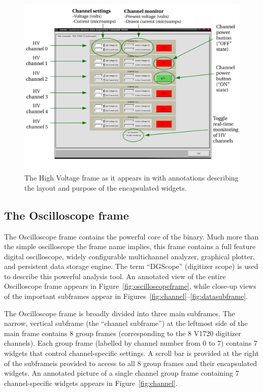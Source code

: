 \begin{figure}
  \centering
  \includegraphics[width=6in]{figures/HighVoltageFrame}
  \caption{The High Voltage frame as it appears in
    \ADAQ with annotations describing the layout and
    purpose of the encapsulated widgets.}
  \label{fig:highvoltageframe}
\end{figure}

\subsection{The Oscilloscope frame}
The Oscilloscope frame contains the powerful core of the
\ADAQ binary. Much more than the simple oscilloscope
the frame name implies, this frame contains a full feature digital
oscilloscope, widely configurable multichannel analyzer, graphical
plotter, and persistent data storage engine. The term ``DGScope''
(digitizer scope) is used to describe this powerful analysis tool. An
annotated view of the entire Oscilloscope frame appears in
Figure~\ref{fig:oscilloscopeframe}, while close-up views of the
important subframes appear in
Figures~\ref{fig:channel}--\ref{fig:datasubframe}.

The Oscilloscope frame is broadly divided into three main
subframes. The narrow, vertical subframe (the ``channel subframe'') at
the leftmost side of the main frame contains 8 group frames
(corresponding to the 8 V1720 digitizer channels).  Each group frame
(labelled by channel number from 0 to 7) contains 7 widgets that
control channel-specific settings. A scroll bar is provided at the
right of the subframeis provided to access to all 8 group frames and
their encapsulated widgets. An annotated picture of a single channel
group frame containing 7 channel-specific widgets appears in
Figure~\ref{fig:channel}.

